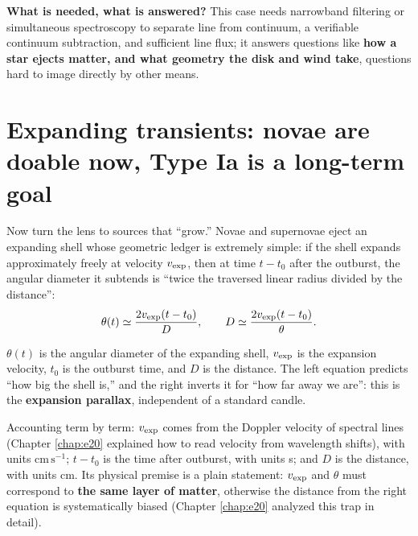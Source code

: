 \textbf{What is needed, what is answered?} This case needs narrowband filtering or simultaneous spectroscopy to separate line from continuum, a verifiable continuum subtraction, and sufficient line flux; it answers questions like \textbf{how a star ejects matter, and what geometry the disk and wind take}, questions hard to image directly by other means.

\section{Expanding transients: novae are doable now, Type Ia is a long-term goal}
\label{sec:e25-transient}

Now turn the lens to sources that ``grow.'' Novae and supernovae eject an expanding shell whose geometric ledger is extremely simple: if the shell expands approximately freely at velocity \(v_{\rm exp}\), then at time \(t-t_0\) after the outburst, the angular diameter it subtends is ``twice the traversed linear radius divided by the distance'':
\begin{equation}
  \theta(t)
  \simeq
  \frac{2v_{\rm exp}(t-t_0)}{D},
  \qquad
  D
  \simeq
  \frac{2v_{\rm exp}(t-t_0)}{\theta}.
  \label{eq:e25-expansion}
\end{equation}
\begin{formulaexplain}
\(\theta(t)\) is the angular diameter of the expanding shell, \(v_{\rm exp}\) is the expansion velocity, \(t_0\) is the outburst time, and \(D\) is the distance. The left equation predicts ``how big the shell is,'' and the right inverts it for ``how far away we are'': this is the \textbf{expansion parallax}, independent of a standard candle.
\end{formulaexplain}
Accounting term by term: \(v_{\rm exp}\) comes from the Doppler velocity of spectral lines (Chapter \ref{chap:e20} explained how to read velocity from wavelength shifts), with units \(\mathrm{cm\,s^{-1}}\); \(t-t_0\) is the time after outburst, with units s; and \(D\) is the distance, with units cm. Its physical premise is a plain statement: \(v_{\rm exp}\) and \(\theta\) must correspond to \textbf{the same layer of matter}, otherwise the distance from the right equation is systematically biased (Chapter \ref{chap:e20} analyzed this trap in detail).

